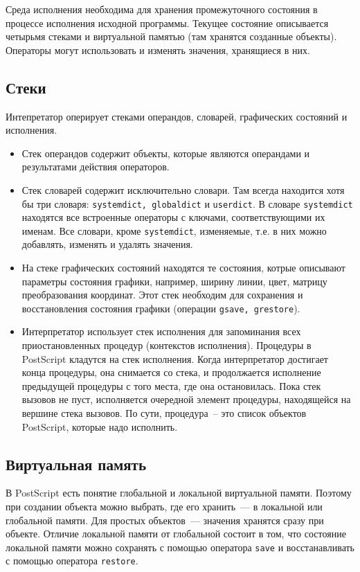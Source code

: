 \documentclass[14pt]{extarticle}
\begin{document}
Среда исполнения необходима для хранения промежуточного состояния в процессе исполнения исходной программы. Текущее состояние описывается четырьмя стеками и виртуальной памятью (там хранятся созданные объекты). Операторы могут использовать и изменять значения, хранящиеся в них.

\subsection{Стеки}
Интепретатор оперирует стеками операндов, словарей, графических состояний и исполнения. 
\begin{itemize}
\item Стек операндов содержит объекты, которые являются операндами и результатами действия операторов. 
\item Стек словарей содержит исключительно словари. Там всегда находится хотя бы три словаря: \texttt{systemdict, globaldict} и \texttt{userdict}. В словаре \texttt{systemdict} находятся все встроенные операторы с ключами, соответствующими их именам. Все словари, кроме \texttt{systemdict}, изменяемые, т.е. в них можно добавлять, изменять и удалять значения.
\item На стеке графических состояний находятся те состояния, котрые описывают параметры состояния графики, например, ширину линии, цвет, матрицу преобразования координат. Этот стек необходим для сохранения и восстановления состояния графики (операции \texttt{gsave, grestore}).
\item Интерпретатор использует стек исполнения для запоминания всех приостановленных процедур (контекстов исполнения). Процедуры в PostScript кладутся на стек исполнения. Когда интерпретатор достигает конца процедуры, она снимается со стека, и продолжается исполнение предыдущей процедуры с того места, где она  остановилась. Пока стек вызовов не пуст, исполняется очередной элемент процедуры, находящейся на вершине стека вызовов. По сути, процедура~-- это список объектов PostScript, которые надо исполнить.
\end{itemize}
 
\subsection{Виртуальная память}
В PostScript есть понятие глобальной и локальной виртуальной памяти. Поэтому при создании объекта можно выбрать, где его хранить~--- в локальной или глобальной памяти. Для простых объектов~--- значения хранятся сразу при объекте. Отличие локальной памяти от глобальной состоит в том, что состояние локальной памяти можно сохранять с помощью оператора \texttt{save} и восстанавливать с помощью оператора \texttt{restore}.
\end{document}
